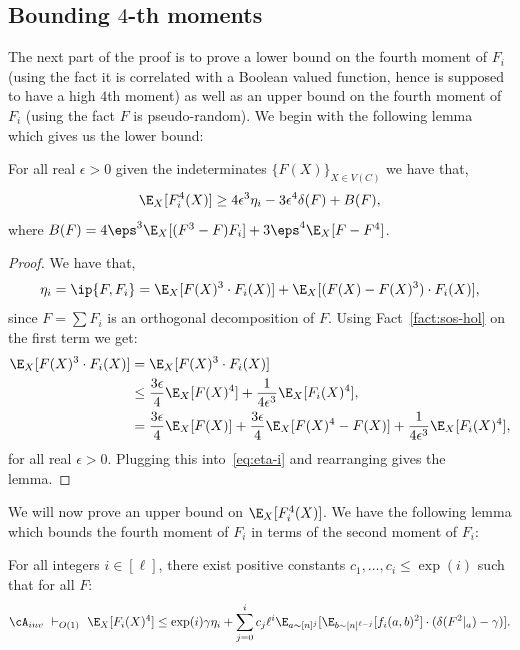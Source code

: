 \subsection{Bounding $4$-th moments}
The next part of the proof is to prove a lower 
bound on the fourth moment of $F_i$ (using the fact
it is correlated with a Boolean valued function, 
hence is supposed to have a high $4$th moment) 
as well as an upper bound on the fourth moment of 
$F_i$ (using the fact $F$ is pseudo-random). We 
begin with the following lemma which gives us the lower bound:
\begin{lemma}\label{lem:lower-bound}
For all real $\epsilon > 0$ given the indeterminates $\{F(X)\}_{X \in V(C)}$ we have that,
$$\E_X[F_i^4(X)] \geq 4\epsilon^3 \eta_i - 3\epsilon^4\delta(F) + B(F),$$
where $B(F) = 4\eps^3\E_X[(F^{ 3} - F)F_i]+3\eps^4 \E_X[F - F^{ 4}]$.
\end{lemma}

\begin{proof}
We have that, 
\begin{align}\label{eq:eta-i}
\eta_i = \ip{F,F_i} = \E_X[F(X)^3 \cdot F_i(X)] + \E_X[(F(X) - F(X)^3) \cdot F_i(X)],
\end{align}
since $F = \sum F_i$ is an orthogonal decomposition of $F$. Using Fact~\ref{fact:sos-hol} on the first term we get:
\begin{align*}
\E_X[F(X)^3 \cdot F_i(X)] &= 
\E_X[F(X)^3 \cdot F_i(X)]\\
&\leq  
\frac{3\epsilon}{4}\E_X[F(X)^4] + \frac{1}{4\epsilon^3}\E_X[F_i(X)^4],\\
&= \frac{3\epsilon}{4}\E_X[F(X)] +\frac{3\epsilon}{4}\E_X[F(X)^4 - F(X)] +  \frac{1}{4\epsilon^3}\E_X[F_i(X)^4],
\end{align*}
for all real $\epsilon > 0$. Plugging this into~\eqref{eq:eta-i} and rearranging gives the lemma.
\end{proof}


We will now prove an upper bound on $\E_X[F_i^4(X)]$. We have the following lemma which bounds the fourth moment of $F_i$ in terms of the second moment of $F_i$:



\begin{lemma}\label{lem:upper-bound}
For all integers $i \in [\ell]$, there exist positive constants $c_1, \ldots, c_i \leq \exp(i)$ such that for all $F$:
\[\cA_{inv} \,\, \vdash_{O(1)}\,\, \E_X[F_i(X)^4] \leq \exp(i)\gamma \eta_i + \sum_{j = 0}^i c_j \ell^{i}\E_{a \sim [n]^{j}}[\E_{b \sim [n]^{\ell-j}}[f_i(a,b)^2]\cdot (\delta(F^{ 2}|_a) - \gamma)].\] 
\end{lemma}


